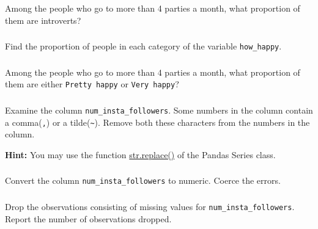 \documentclass[
  letterpaper,
  DIV=11,
  numbers=noendperiod]{scrreprt}
\begin{document}
Among the people who go to more than 4 parties a month, what proportion
of them are introverts?

\hypertarget{section-32}{%
\subsubsection{}\label{section-32}}

Find the proportion of people in each category of the variable
\texttt{how\_happy}.

\hypertarget{section-33}{%
\subsubsection{}\label{section-33}}

Among the people who go to more than 4 parties a month, what proportion
of them are either \texttt{Pretty\ happy} or \texttt{Very\ happy}?

\hypertarget{section-34}{%
\subsubsection{}\label{section-34}}

Examine the column \texttt{num\_insta\_followers}. Some numbers in the
column contain a comma(\texttt{,}) or a
tilde(\texttt{\textasciitilde{}}). Remove both these characters from the
numbers in the column.

\textbf{Hint:} You may use the function
\href{https://pandas.pydata.org/docs/reference/api/pandas.Series.str.replace.html}{str.replace()}
of the Pandas Series class.

\hypertarget{section-35}{%
\subsubsection{}\label{section-35}}

Convert the column \texttt{num\_insta\_followers} to numeric. Coerce the
errors.

\hypertarget{section-36}{%
\subsubsection{}\label{section-36}}

Drop the observations consisting of missing values for
\texttt{num\_insta\_followers}. Report the number of observations
dropped.

\hypertarget{section-37}{%
\subsubsection{}\label{section-37}}
\end{document}

